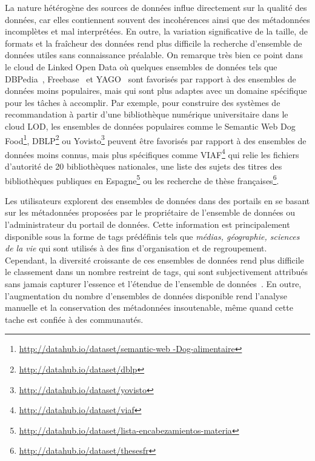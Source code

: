 La nature h\'{e}t\'{e}rog\`{e}ne des sources de donn\'{e}es influe directement sur la qualit\'{e} des donn\'{e}es, car elles contiennent souvent des incoh\'{e}rences ainsi que des m\'{e}tadonn\'{e}es incompl\`{e}tes et mal interpr\'{e}t\'{e}es. En outre, la variation significative de la taille, de formats et la fraîcheur des donn\'{e}es rend plus difficile la recherche d'ensemble de donn\'{e}es utiles sans connaissance pr\'{e}alable. On remarque tr\`{e}s bien ce point dans le cloud de Linked Open Data o\`{u} quelques ensembles de donn\'{e}es tels que DBPedia~\cite{Bizer:WebSemJorunal:09}, Freebase~\cite{Bollacker:SIGMOD:08} et YAGO~\cite{Suchanek::WWW:07} sont favoris\'{e}s par rapport \`{a} des ensembles de donn\'{e}es moins populaires, mais qui sont plus adaptes avec un domaine sp\'{e}cifique pour les tâches \`{a} accomplir. Par exemple, pour construire des syst\`{e}mes de recommandation \`{a} partir d'une biblioth\`{e}que num\'{e}rique universitaire dans le cloud LOD, les ensembles de donn\'{e}es populaires comme le Semantic Web Dog Food\footnote{\url{http://datahub.io/dataset/semantic-web -Dog-alimentaire}}, DBLP\footnote{\url{http://datahub.io/dataset/dblp}} ou Yovisto\footnote{\url{http://datahub.io/dataset/yovisto}} peuvent \^{e}tre favoris\'{e}s par rapport \`{a} des ensembles de donn\'{e}es moins connus, mais plus sp\'{e}cifiques comme VIAF\footnote{\url{http://datahub.io/dataset/viaf}} qui relie les fichiers d'autorit\'{e} de 20 biblioth\`{e}ques nationales, une liste des sujets des titres des biblioth\`{e}ques publiques en Espagne\footnote{\url{http://datahub.io/dataset/lista-encabezamientos-materia}} ou les recherche de th\`{e}se françaises\footnote{\url{http://datahub.io/dataset/thesesfr}}.

Les utilisateurs explorent des ensembles de donn\'{e}es dans des portails en se basant sur les m\'{e}tadonn\'{e}es propos\'{e}es par le propri\'{e}taire de l'ensemble de donn\'{e}es ou l'administrateur du portail de donn\'{e}es. Cette information est principalement disponible sous la forme de tags pr\'{e}d\'{e}finis tels que \textit{m\'{e}dias, g\'{e}ographie, sciences de la vie} qui sont utilis\'{e}s \`{a} des fins d'organisation et de regroupement. Cependant, la diversit\'{e} croissante de ces ensembles de donn\'{e}es rend plus difficile le classement dans un nombre restreint de tags, qui sont subjectivement attribu\'{e}s sans jamais capturer l'essence et l'\'{e}tendue de l'ensemble de donn\'{e}es~\cite {Lalithsena:WI:13}. En outre, l'augmentation du nombre d'ensembles de donn\'{e}es disponible rend l'analyse manuelle et la conservation des m\'{e}tadonn\'{e}es insoutenable, m\^{e}me quand cette tache est confi\'{e}e \`{a} des communaut\'{e}s.

